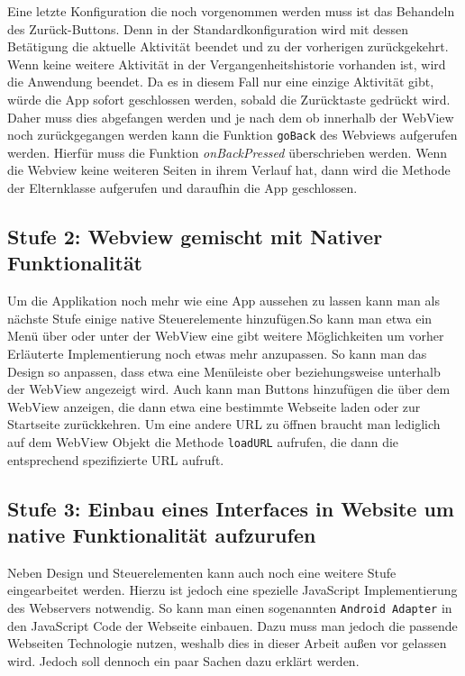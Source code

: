 Eine letzte Konfiguration die noch vorgenommen werden muss ist das Behandeln des Zurück-Buttons. 
Denn in der Standardkonfiguration wird mit dessen Betätigung die aktuelle Aktivität beendet und zu der vorherigen zurückgekehrt. 
Wenn keine weitere Aktivität in der Vergangenheitshistorie vorhanden ist, wird die Anwendung beendet. 
Da es in diesem Fall nur eine einzige Aktivität gibt, würde die App sofort geschlossen werden, sobald die Zurücktaste gedrückt wird. 
Daher muss dies abgefangen werden und je nach dem ob innerhalb der WebView noch zurückgegangen werden kann die Funktion \verb|goBack| des Webviews aufgerufen werden. 
Hierfür muss die Funktion \textsl{onBackPressed} überschrieben werden. Wenn die Webview keine weiteren Seiten in ihrem Verlauf hat, dann wird die Methode der Elternklasse aufgerufen und daraufhin die App geschlossen.

\subsection{Stufe 2: Webview gemischt mit Nativer Funktionalität}
Um die Applikation noch mehr wie eine App aussehen zu lassen kann man als nächste Stufe einige native Steuerelemente hinzufügen.So kann man etwa ein Menü über oder unter der WebView eine gibt weitere Möglichkeiten um vorher Erläuterte Implementierung noch etwas mehr anzupassen. 
So kann man das Design so anpassen, dass etwa eine Menüleiste ober beziehungsweise unterhalb der WebView angezeigt wird. Auch kann man Buttons hinzufügen die über dem WebView anzeigen, die dann etwa eine bestimmte Webseite laden oder zur Startseite zurückkehren. Um eine andere URL zu öffnen braucht man lediglich auf dem WebView Objekt die Methode \verb|loadURL| aufrufen, die dann die entsprechend spezifizierte URL aufruft. 

\subsection{Stufe 3: Einbau eines Interfaces in Website um native Funktionalität aufzurufen}
Neben Design und Steuerelementen kann auch noch eine weitere Stufe eingearbeitet werden. Hierzu ist jedoch eine spezielle JavaScript Implementierung des Webservers notwendig. So kann man einen sogenannten \verb|Android Adapter| in den JavaScript Code der Webseite einbauen. Dazu muss man jedoch die passende Webseiten Technologie nutzen, weshalb dies in dieser Arbeit außen vor gelassen wird. Jedoch soll dennoch ein paar Sachen dazu erklärt werden.

